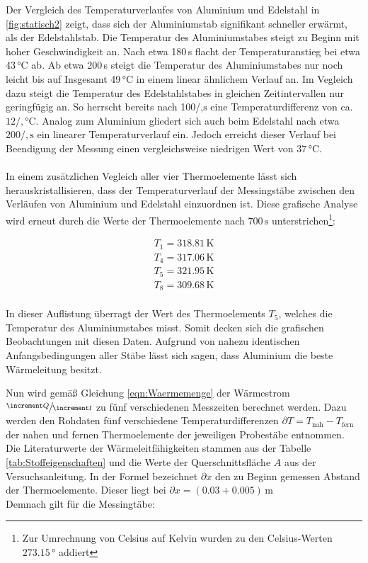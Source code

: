 Der Vergleich des Temperaturverlaufes von Aluminium und Edelstahl in \ref{fig:statisch2} zeigt, dass 
sich der Aluminiumstab signifikant schneller erwärmt, als der Edelstahlstab.
Die Temperatur des Aluminiumstabes steigt zu Beginn mit hoher Geschwindigkeit an. Nach etwa 180\,\unit{\second} 
flacht der Temperaturanstieg bei etwa 43\,\unit{\celsius} ab. Ab etwa 200\,\unit{\second} steigt die Temperatur des Aluminiumstabes 
nur noch leicht bis auf Insgesamt 49\,\unit{\celsius} in einem linear ähnlichem Verlauf an. Im Vegleich dazu steigt die Temperatur 
des Edelstahlstabes in gleichen Zeitintervallen nur geringfügig an. So herrscht bereits nach 100/,$\unit{\second}$ eine
Temperaturdifferenz von ca. $12/,\unit{\celsius}$. Analog zum Aluminium gliedert sich auch beim Edelstahl nach etwa $200/,\unit{\second}$
ein linearer Temperaturverlauf ein. Jedoch erreicht dieser Verlauf bei Beendigung der Messung einen vergleichsweise niedrigen
Wert von $37\,\unit{\celsius}$. \\\\
In einem zusätzlichen Vegleich aller vier Thermoelemente lässt sich herauskristallisieren, dass der Temperaturverlauf der Messingstäbe
zwischen den Verläufen von Aluminium und Edelstahl einzuordnen ist. Diese grafische Analyse wird erneut durch die Werte der Thermoelemente
nach $700\,\unit{\second}$ unterstrichen\footnote{Zur Umrechnung von Celsius auf Kelvin wurden zu den Celsius-Werten $273.15\,\unit{\degree}$ addiert}:

\begin{gather*}
  T_1 = 318.81\,\unit{\kelvin}\\ 
  T_4 = 317.06\,\unit{\kelvin}\\
  T_5 = 321.95\,\unit{\kelvin}\\
  T_8 = 309.68\,\unit{\kelvin}\\
\end{gather*}

In dieser Auflistung überragt der Wert des Thermoelements $T_5$, welches die Temperatur des Aluminiumstabes misst. Somit decken sich die grafischen
Beobachtungen mit diesen Daten. Aufgrund von nahezu identischen Anfangsbedingungen aller Stäbe lässt sich sagen, dass Aluminium die beste 
Wärmeleitung besitzt.

Nun wird gemäß Gleichung \eqref{eqn:Waermemenge} der Wärmestrom $\sfrac{\increment Q}{\increment t}$ zu fünf verschiedenen Messzeiten berechnet
werden. Dazu werden den Rohdaten fünf verschiedene Temperaturdifferenzen $\partial T = T_\text{nah} - T_\text{fern}$ der nahen und fernen Thermoelemente der jeweiligen Probestäbe entnommen.
Die Literaturwerte der Wärmeleitfähigkeiten stammen aus der Tabelle \ref{tab:Stoffeigenschaften} und die Werte der Querschnittsfläche $A$ aus der
Versuchsanleitung\cite{Versuchsanleitung_v204}. In der Formel bezeichnet $\partial x$ den zu Beginn gemessen Abstand der Thermoelemente. 
Dieser liegt bei $\partial x = \left(0.03 + 0.005\right)\,\unit{\meter}$ \\
Demnach gilt für die Messingtäbe:

